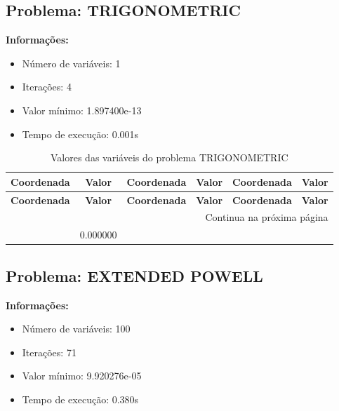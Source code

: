 \documentclass[12pt]{article}
\begin{document}
\newpage            
\subsection{Problema: TRIGONOMETRIC}

\textbf{Informações:}
\begin{itemize}
\item Número de variáveis: 1
\item Iterações: 4
\item Valor mínimo: 1.897400e-13
\item Tempo de execução: 0.001s
\end{itemize}

\small
\begin{longtable}{@{}cc|cc|cc@{}}
\caption{Valores das variáveis do problema TRIGONOMETRIC} \\
\toprule
\textbf{Coordenada} & \textbf{Valor} & \textbf{Coordenada} & \textbf{Valor} & \textbf{Coordenada} & \textbf{Valor} \\
\midrule
\endfirsthead

\toprule
\textbf{Coordenada} & \textbf{Valor} & \textbf{Coordenada} & \textbf{Valor} & \textbf{Coordenada} & \textbf{Valor} \\
\midrule
\endhead

\midrule \multicolumn{6}{r}{{Continua na próxima página}} \\ \midrule
\endfoot

\bottomrule
\endlastfoot
1 & 0.000000 &  &  &  &  \\

\end{longtable}


\newpage            
\subsection{Problema: EXTENDED POWELL}

\textbf{Informações:}
\begin{itemize}
\item Número de variáveis: 100
\item Iterações: 71
\item Valor mínimo: 9.920276e-05
\item Tempo de execução: 0.380s
\end{itemize}
\end{document}
